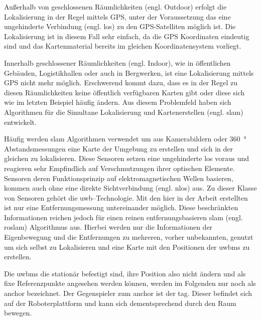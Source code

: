 Außerhalb von geschlossenen Räumlichkeiten (engl. Outdoor) erfolgt die Lokalisierung in der Regel mittels GPS, unter der Voraussetzung das eine ungehinderte Verbindung (engl. \acrfull{los}) zu den GPS-Satelliten möglich ist. Die Lokalisierung ist in diesem Fall sehr einfach, da die GPS Koordinaten eindeutig sind und das Kartenmaterial bereits im gleichen Koordinatensystem vorliegt.

Innerhalb geschlossener Räumlichkeiten (engl. Indoor), wie in öffentlichen Gebäuden, Logistikhallen oder auch in Bergwerken, ist eine Lokalisierung mittels GPS nicht mehr möglich. Erschwerend kommt dazu, dass es in der Regel zu diesen Räumlichkeiten keine öffentlich verfügbaren Karten gibt oder diese sich wie im letzten Beispiel häufig ändern. Aus diesem Problemfeld haben sich Algorithmen für die Simultane Lokalisierung und Kartenerstellen (engl. \Gls{slam}) entwickelt.

Häufig werden \Gls{slam} Algorithmen verwendet um aus Kamerabildern oder \SI{360}{\degree} Abstandsmessungen eine Karte der Umgebung zu erstellen und sich in der gleichen zu lokalisieren. Diese Sensoren setzen eine ungehinderte \Gls{los} voraus und reagieren sehr Empfindlich auf Verschmutzungen ihrer optischen Elemente. Sensoren deren Funktionsprinzip auf elektromagnetischen Wellen basieren, kommen auch ohne eine direkte Sichtverbindung (engl. \Gls{nlos}) aus. Zu dieser Klasse von Sensoren gehört die \Gls{uwb}--Technologie. Mit den hier in der Arbeit erstellten  ist nur eine Entfernungsmessung untereinander möglich. Diese beschränkten Informationen reichen jedoch für einen reinen entfernungsbasieren \Gls{slam} (engl. \gls{roslam}) Algorithmus aus. Hierbei werden nur die Informationen der Eigenbewegung und die Entfernungen zu mehreren, vorher unbekannten,  genutzt um sich selbst zu Lokalisieren und eine Karte mit den Positionen der \Glspl{uwbm} zu erstellen.

Die \Glspl{uwbm} die stationär befestigt sind, ihre Position also nicht ändern und als fixe Referenzpunkte angesehen werden können, werden im Folgenden nur noch als \Gls{anchor} bezeichnet. Der Gegenspieler zum \Gls{anchor} ist der \Gls{tag}. Dieser befindet sich auf der Roboterplattform und kann sich dementsprechend durch den Raum bewegen.


\begin{comment}
------------------------------------------------------------------------------------------
\end{comment}


